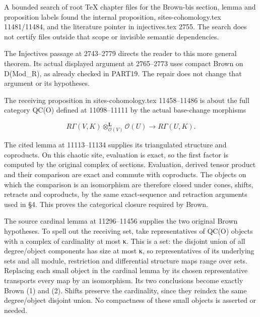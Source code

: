 \documentclass[11pt]{article}
\begin{document}
A bounded search of root TeX chapter files for the Brown-bis section,\allowbreak{} lemma and proposition labels found the internal proposition,\allowbreak{} sites-cohomology.tex 11481/\allowbreak{}11484,\allowbreak{} and the literature pointer in injectives.tex 2755. The search does not certify files outside that scope or invisible semantic dependencies.

The Injectives passage at 2743–\allowbreak{}2779 directs the reader to this more general theorem. Its actual displayed argument at 2765–\allowbreak{}2773 uses compact Brown on D(Mod\_\allowbreak{}R)\allowbreak{},\allowbreak{} as already checked in PART19. The repair does not change that argument or its hypotheses.

The receiving proposition in sites-cohomology.tex 11458–\allowbreak{}11486 is about the full category QC(O)\allowbreak{} defined at 11098–\allowbreak{}11111 by the actual base-change morphisms

\[
 R\Gamma(V,K)\otimes_{\mathcal O(V)}^{\mathbf L}\mathcal O(U)
       \longrightarrow R\Gamma(U,K).
\]

The cited lemma at 11113–\allowbreak{}11134 supplies its triangulated structure and coproducts. On this chaotic site,\allowbreak{} evaluation is exact,\allowbreak{} so the first factor is computed by the original complex of sections. Evaluation,\allowbreak{} derived tensor product and their comparison are exact and commute with coproducts. The objects on which the comparison is an isomorphism are therefore closed under cones,\allowbreak{} shifts,\allowbreak{} retracts and coproducts,\allowbreak{} by the same exact-sequence and retraction arguments used in §4. This proves the categorical closure required by Brown.

The source cardinal lemma at 11296–\allowbreak{}11456 supplies the two original Brown hypotheses. To spell out the receiving set,\allowbreak{} take representatives of QC(O)\allowbreak{} objects with a complex of cardinality at most κ. This is a set:\allowbreak{} the disjoint union of all degree/\allowbreak{}object components has size at most κ,\allowbreak{} so representatives of its underlying sets and all module,\allowbreak{} restriction and differential structure maps range over sets. Replacing each small object in the cardinal lemma by its chosen representative transports every map by an isomorphism. Its two conclusions become exactly Brown (1)\allowbreak{} and (2)\allowbreak{}. Shifts preserve the cardinality,\allowbreak{} since they reindex the same degree/\allowbreak{}object disjoint union. No compactness of these small objects is asserted or needed.
\end{document}
